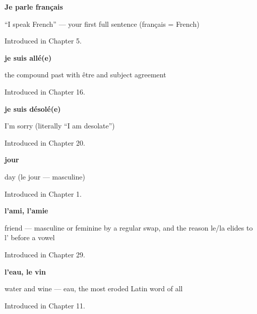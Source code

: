 \noindent\begin{minipage}[t]{\linewidth}
\raggedright
\textbf{Je parle français}\par
\small \textquotedblleft{}I speak French\textquotedblright{} — your first full sentence (français = French)\par
\footnotesize Introduced in Chapter 5.
\end{minipage}\par\medskip

\noindent\begin{minipage}[t]{\linewidth}
\raggedright
\textbf{je suis allé(e)}\par
\small the compound past with être and subject agreement\par
\footnotesize Introduced in Chapter 16.
\end{minipage}\par\medskip

\noindent\begin{minipage}[t]{\linewidth}
\raggedright
\textbf{je suis désolé(e)}\par
\small I'm sorry (literally \textquotedblleft{}I am desolate\textquotedblright{})\par
\footnotesize Introduced in Chapter 20.
\end{minipage}\par\medskip

\noindent\begin{minipage}[t]{\linewidth}
\raggedright
\textbf{jour}\par
\small day (le jour — masculine)\par
\footnotesize Introduced in Chapter 1.
\end{minipage}\par\medskip

\noindent\begin{minipage}[t]{\linewidth}
\raggedright
\textbf{l'ami, l'amie}\par
\small friend — masculine or feminine by a regular swap, and the reason le/la elides to l' before a vowel\par
\footnotesize Introduced in Chapter 29.
\end{minipage}\par\medskip

\noindent\begin{minipage}[t]{\linewidth}
\raggedright
\textbf{l'eau, le vin}\par
\small water and wine — eau, the most eroded Latin word of all\par
\footnotesize Introduced in Chapter 11.
\end{minipage}\par\medskip

